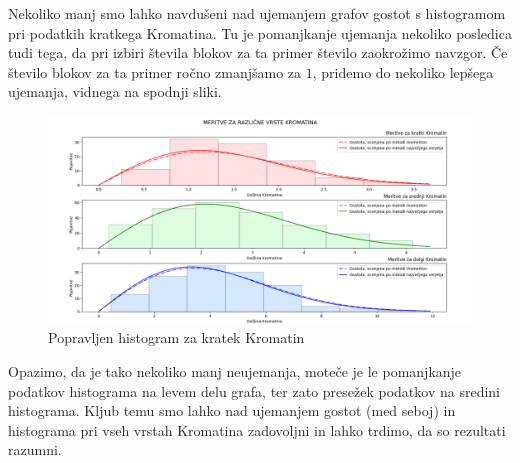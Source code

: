 \documentclass{article}
\begin{document}
Nekoliko manj smo lahko navdušeni nad ujemanjem grafov gostot s histogramom pri podatkih kratkega Kromatina. Tu je pomanjkanje ujemanja nekoliko posledica tudi tega, da pri izbiri števila blokov za ta primer število zaokrožimo navzgor.
Če število blokov za ta primer ročno zmanjšamo za $1$, pridemo do nekoliko lepšega ujemanja, vidnega na spodnji sliki.
\begin{figure}[H]
    \begin{center}
    \includegraphics[width=\linewidth]{naloga2ff.png}
    \vspace*{-5mm}\caption{Popravljen histogram za kratek Kromatin}
    \end{center}    
\end{figure}
Opazimo, da je tako nekoliko manj neujemanja, moteče je le pomanjkanje podatkov histograma na levem delu grafa, ter zato presežek podatkov na sredini histograma. 
Kljub temu smo lahko nad ujemanjem gostot (med seboj) in histograma pri vseh vrstah Kromatina zadovoljni in lahko trdimo, da so rezultati razumni.

\pagebreak
\end{document}
